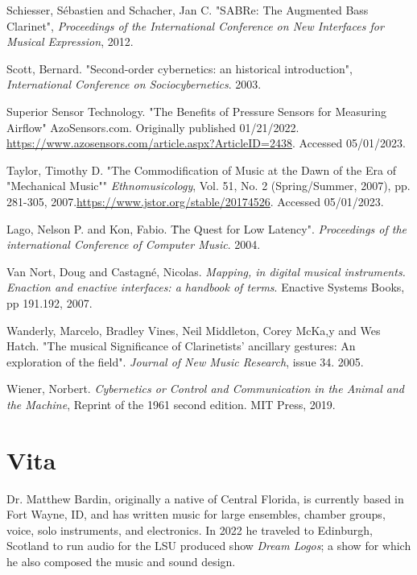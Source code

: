 \begin{thebibliography}{99}
 Schiesser, S{\'e}bastien and Schacher, Jan C. "SABRe: The Augmented Bass Clarinet", \textit{Proceedings of the International Conference on New Interfaces for Musical Expression}, 2012.

 Scott, Bernard. "Second-order cybernetics: an historical introduction", \textit{International Conference on Sociocybernetics}. 2003.

 Superior Sensor Technology. "The Benefits of Pressure Sensors for Measuring Airflow" AzoSensors.com. Originally published 01/21/2022. \url{https://www.azosensors.com/article.aspx?ArticleID=2438}. Accessed 05/01/2023.

 Taylor, Timothy D. "The Commodification of Music at the Dawn of the Era of "Mechanical Music"" \textit{Ethnomusicology}, Vol. 51, No. 2 (Spring/Summer, 2007), pp. 281-305, 2007.\url{https://www.jstor.org/stable/20174526}. Accessed 05/01/2023. 

 Lago, Nelson P. and Kon, Fabio. \"The Quest for Low Latency". \textit{Proceedings of the international Conference of Computer Music}. 2004.

  Van Nort, Doug and Castagné, Nicolas. \emph{Mapping, in digital musical instruments. Enaction and enactive interfaces: a handbook of terms}. Enactive Systems Books, pp 191.192, 2007.

 Wanderly, Marcelo, Bradley Vines, Neil Middleton, Corey McKa,y and Wes Hatch. "The musical Significance of Clarinetists' ancillary gestures: An exploration of the field". \textit{Journal of New Music Research}, issue 34. 2005.

 Wiener, Norbert. \emph{Cybernetics or Control and Communication in the Animal and the Machine}, Reprint of the 1961 second edition. MIT Press, 2019.

\end{thebibliography}


\chapter{Vita}
Dr. Matthew Bardin, originally a native of Central Florida, is currently based in Fort Wayne, ID, and has written music for large ensembles, chamber groups, voice, solo instruments, and electronics. In 2022 he traveled to Edinburgh, Scotland to run audio for the LSU produced show \textit{Dream Logos}; a show for which he also composed the music and sound design. 

